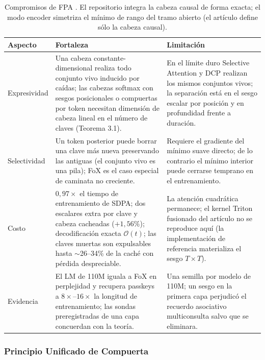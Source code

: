 \begin{table}[H]
\centering
\footnotesize
\begin{tabularx}{\linewidth}{lXX}
\toprule
\textbf{Aspecto} & \textbf{Fortaleza} & \textbf{Limitación} \\
\midrule
Expresividad & Una cabeza constante-dimensional realiza todo conjunto vivo inducido por caídas; las cabezas softmax con sesgos posicionales o compuertas por token necesitan dimensión de cabeza lineal en el número de claves (Teorema 3.1). & En el límite duro Selective Attention y DCP realizan los mismos conjuntos vivos; la separación está en el sesgo escalar por posición y en profundidad frente a duración. \\
Selectividad & Un token posterior puede borrar una clave más nueva preservando las antiguas (el conjunto vivo es una pila); FoX es el caso especial de caminata no creciente. & Requiere el gradiente del mínimo suave directo; de lo contrario el mínimo interior puede cerrarse temprano en el entrenamiento. \\
Costo & $0{,}97\times$ el tiempo de entrenamiento de SDPA; dos escalares extra por clave y cabeza cacheadas ($+1{,}56\%$); decodificación exacta $\mathcal{O}(t)$; las claves muertas son expulsables hasta $\sim$26--34\% de la caché con pérdida despreciable. & La atención cuadrática permanece; el kernel Triton fusionado del artículo no se reproduce aquí (la implementación de referencia materializa el sesgo $T\times T$). \\
Evidencia & El LM de 110M iguala a FoX en perplejidad y recupera passkeys a $8\times$--$16\times$ la longitud de entrenamiento; las sondas preregistradas de una capa concuerdan con la teoría. & Una semilla por modelo de 110M; un sesgo en la primera capa perjudicó el recuerdo asociativo multiconsulta salvo que se eliminara. \\
\bottomrule
\end{tabularx}
\caption{Compromisos de FPA \citep{liu_first_passage_2026}. El repositorio integra la cabeza causal de forma exacta; el modo encoder simetriza el mínimo de rango del tramo abierto (el artículo define sólo la cabeza causal).}
\label{tab:fpa-tradeoffs-es}
\end{table}

\normalsize

\subsubsection{Principio Unificado de Compuerta}

